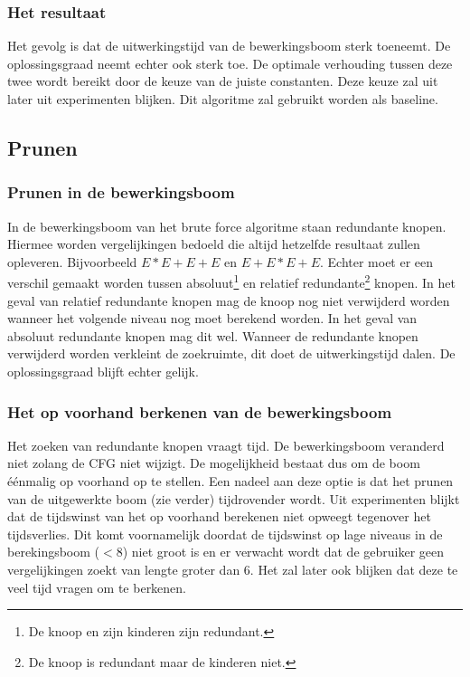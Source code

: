 \documentclass[Main.tex]{subfiles}
\begin{document}
\subsubsection*{Het resultaat}
Het gevolg is dat de uitwerkingstijd van de bewerkingsboom sterk toeneemt. De oplossingsgraad neemt echter ook sterk toe. De optimale verhouding tussen deze twee wordt bereikt door de keuze van de juiste constanten. Deze keuze zal uit later uit experimenten blijken. Dit algoritme zal gebruikt worden als baseline.

\subsection{Prunen} \label{ssec:Prunen}
\subsubsection*{Prunen in de bewerkingsboom}
In de bewerkingsboom van het brute force algoritme staan redundante knopen. Hiermee worden vergelijkingen bedoeld die altijd hetzelfde resultaat zullen opleveren. Bijvoorbeeld $E \ast E+E+E$ en $E+E \ast E +E$. Echter moet er een verschil gemaakt worden tussen absoluut\footnote{\label{note:absoluut}De knoop en zijn kinderen zijn redundant.} en relatief redundante\footnote{\label{note:relatief}De knoop is redundant maar de kinderen niet.} knopen.
In het geval van relatief redundante knopen mag de knoop nog niet verwijderd worden wanneer het volgende niveau nog moet berekend worden. In het geval van absoluut redundante knopen mag dit wel. Wanneer de redundante knopen verwijderd worden verkleint de zoekruimte, dit doet de uitwerkingstijd dalen. De oplossingsgraad blijft echter gelijk.

\subsubsection*{Het op voorhand berkenen van de bewerkingsboom}
Het zoeken van redundante knopen vraagt tijd. De bewerkingsboom veranderd niet zolang de CFG niet wijzigt. De mogelijkheid bestaat dus om de boom \'e\'enmalig op voorhand op te stellen. Een nadeel aan deze optie is dat het prunen van de uitgewerkte boom (zie verder) tijdrovender wordt. Uit experimenten blijkt dat de tijdswinst van het op voorhand berekenen niet opweegt tegenover het tijdsverlies. Dit komt voornamelijk doordat de tijdswinst op lage niveaus in de berekingsboom ($< 8$) niet groot is en er verwacht wordt dat de gebruiker geen vergelijkingen zoekt van lengte groter dan 6. Het zal later ook blijken dat deze te veel tijd vragen om te berkenen. 
\end{document}
